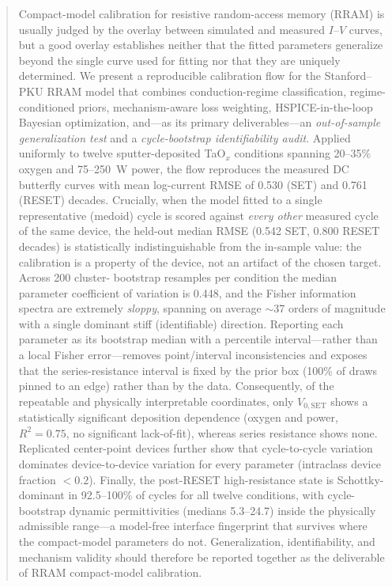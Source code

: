 \documentclass[journal]{IEEEtran}
\begin{document}
\begin{abstract}
Compact-model calibration for resistive random-access memory (RRAM) is
usually judged by the overlay between simulated and measured $I$--$V$
curves, but a good overlay establishes neither that the fitted parameters
generalize beyond the single curve used for fitting nor that they are
uniquely determined.  We present a reproducible calibration flow for the
Stanford--PKU RRAM model that combines conduction-regime classification,
regime-conditioned priors, mechanism-aware loss weighting,
HSPICE-in-the-loop Bayesian optimization, and---as its primary
deliverables---an \emph{out-of-sample generalization test} and a
\emph{cycle-bootstrap identifiability audit}.  Applied uniformly to twelve
sputter-deposited TaO$_x$ conditions spanning 20--35\% oxygen and
75--250~W power, the flow reproduces the measured DC butterfly curves with
mean log-current RMSE of 0.530 (SET) and 0.761 (RESET) decades.  Crucially,
when the model fitted to a single representative (medoid) cycle is scored
against \emph{every other} measured cycle of the same device, the held-out
median RMSE (0.542 SET, 0.800 RESET decades) is statistically
indistinguishable from the in-sample value: the calibration is a property of
the device, not an artifact of the chosen target.  Across 200 cluster-
bootstrap resamples per condition the median parameter coefficient of
variation is 0.448, and the Fisher information spectra are extremely
\emph{sloppy}, spanning on average $\sim$37 orders of magnitude with a single
dominant stiff (identifiable) direction.  Reporting each parameter as its
bootstrap median with a percentile interval---rather than a local Fisher
error---removes point/interval inconsistencies and exposes that the
series-resistance interval is fixed by the prior box (100\% of draws pinned to
an edge) rather than by the data.  Consequently, of the repeatable and
physically interpretable coordinates, only $V_{0,\mathrm{SET}}$ shows a
statistically significant deposition dependence (oxygen and power,
$R^2=0.75$, no significant lack-of-fit), whereas series resistance shows none.
Replicated center-point devices further show that cycle-to-cycle variation
dominates device-to-device variation for every parameter (intraclass device
fraction $<0.2$).  Finally, the post-RESET high-resistance state is
Schottky-dominant in 92.5--100\% of cycles for all twelve conditions, with
cycle-bootstrap dynamic permittivities (medians 5.3--24.7) inside the
physically admissible range---a model-free interface fingerprint that survives
where the compact-model parameters do not.  Generalization, identifiability,
and mechanism validity should therefore be reported together as the
deliverable of RRAM compact-model calibration.
\end{abstract}
\end{document}
